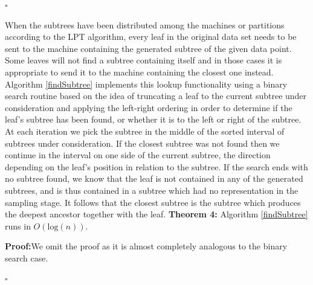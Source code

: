 \documentclass{report}
\begin{document}
\hfill$\square$

{
	\noindent \newline When the subtrees have been distributed among the machines or partitions according to the LPT algorithm, every leaf in the original data set needs to be sent to the
	machine containing the generated subtree of the given data point. Some leaves will not find a subtree containing itself and in those cases it is appropriate to send it to the machine containing the closest one instead.
	Algorithm \ref{findSubtree} implements this lookup functionality using a binary search routine based on the idea of truncating a leaf to the current subtree under consideration and applying the left-right ordering
	in order to determine if the leaf's subtree has been found, or whether it is to the left or right of the
	subtree. At each iteration we pick the subtree in the middle of the sorted interval of subtrees under consideration. If the closest subtree was not found then we continue in the interval on one side
	of the current subtree, the direction depending on the leaf's position in relation to the subtree. If the search ends with no subtree found, we know that the leaf is not contained
	in any of the generated subtrees, and is thus contained in a subtree which had no representation in
	the sampling stage. It follows that the closest subtree is the subtree which produces the deepest ancestor together with the leaf.
}
\newpage
\noindent\textbf{Theorem 4:} Algorithm \ref{findSubtree} runs in $O(\text{log}(n))$.\newline

\noindent\textbf{Proof:}\quad We omit the proof as it is almost completely analogous to the binary search case.

\hfill$\square$\\
\end{document}
